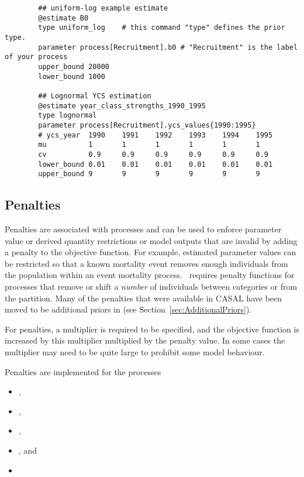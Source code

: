 {\small{\begin{verbatim}
		## uniform-log example estimate
		@estimate B0
		type uniform_log	# this command "type" defines the prior type.
		parameter process[Recruitment].b0 # "Recruitment" is the label of your process
		upper_bound 20000
		lower_bound 1000

		## Lognormal YCS estimation
		@estimate year_class_strengths_1990_1995
		type lognormal
		parameter process[Recruitment].ycs_values{1990:1995}
		# ycs_year  1990	1991	1992	1993	1994	1995
		mu   		1   	1   	1   	1   	1   	1
		cv 			0.9 	0.9 	0.9 	0.9 	0.9 	0.9
		lower_bound 0.01	0.01	0.01	0.01	0.01	0.01
		upper_bound 9		9		9		9		9		9
\end{verbatim}}}

\subsection{Penalties}\label{sec:Penalty}\label{sec:Penalty-Process}

Penalties are associated with processes and can be used to enforce parameter value or derived quantity restrictions or model outputs that are invalid by adding a penalty to the objective function. For example, estimated parameter values can be restricted so that a known mortality event removes enough individuals from the population within an event mortality process. \CNAME\ requires penalty functions for processes that remove or shift a \emph{number} of individuals between categories or from the partition. Many of the penalties that were available in CASAL have been moved to be additional priors in \CNAME (see Section~\ref{sec:AdditionalPriors}).

For penalties, a multiplier is required to be specified, and the objective function is increased by this multiplier multiplied by the penalty value. In some cases the multiplier may need to be quite large to prohibit some model behaviour.

Penalties are implemented for the processes

\begin{itemize}
	\item {},
	\item {},
	\item {},
	\item {}, and
	\item {}
\end{itemize}


